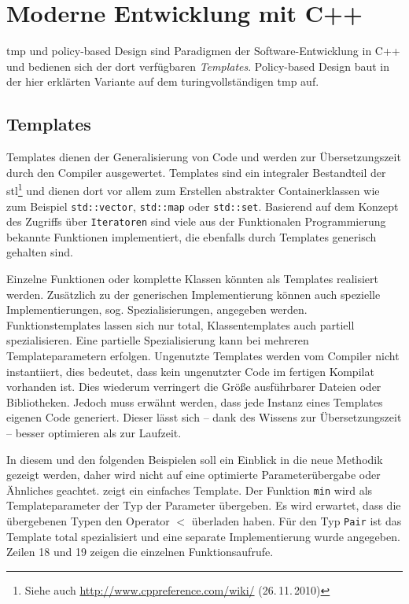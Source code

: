 \chapter{Moderne Entwicklung mit C++}
\label{chap:impl_tmp}
\acf{tmp} und policy-based Design \cite{Alexandrescu2001Modern} sind Paradigmen der Software-Entwicklung in C++ und bedienen sich der dort verfügbaren \emph{Templates}. Policy-based Design baut in der hier erklärten Variante auf dem turingvollständigen \ac{tmp} auf.

\section{Templates}
Templates dienen der Generalisierung von Code und werden zur Übersetzungszeit durch den Compiler ausgewertet. Templates sind ein integraler Bestandteil der \ac{stl}\footnote{Siehe auch \url{http://www.cppreference.com/wiki/} (26.\,11.\,2010)} und dienen dort vor allem zum Erstellen abstrakter Containerklassen wie zum Beispiel \texttt{std::vector}, \texttt{std::map} oder \texttt{std::set}. Basierend auf dem Konzept des Zugriffs über \texttt{Iteratoren} sind viele aus der Funktionalen Programmierung bekannte Funktionen implementiert, die ebenfalls durch Templates generisch gehalten sind.

Einzelne Funktionen oder komplette Klassen könnten als Templates realisiert werden. Zusätzlich zu der generischen Implementierung können auch spezielle Implementierungen, sog. Spezialisierungen, angegeben werden. Funktionstemplates lassen sich nur total, Klassentemplates auch partiell spezialisieren. Eine partielle Spezialisierung kann bei mehreren Templateparametern erfolgen. Ungenutzte Templates werden vom Compiler nicht instantiiert, dies bedeutet, dass kein ungenutzter Code im fertigen Kompilat vorhanden ist. Dies wiederum verringert die Größe ausführbarer Dateien oder Bibliotheken. Jedoch muss erwähnt werden, dass jede Instanz eines Templates eigenen Code generiert. Dieser lässt sich -- dank des Wissens zur Übersetzungszeit -- besser optimieren als zur Laufzeit.

In diesem und den folgenden Beispielen soll ein Einblick in die neue Methodik gezeigt werden, daher wird nicht auf eine optimierte Parameterübergabe oder Ähnliches geachtet.  zeigt ein einfaches Template. Der Funktion \texttt{min} wird als Templateparameter der Typ der Parameter übergeben. Es wird erwartet, dass die übergebenen Typen den Operator $<$ überladen haben. Für den Typ \texttt{Pair} ist das Template total spezialisiert und eine separate Implementierung wurde angegeben. Zeilen 18 und 19 zeigen die einzelnen Funktionsaufrufe.

